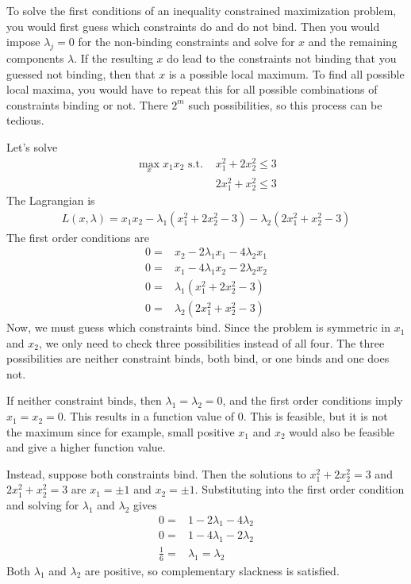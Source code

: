 To solve the first conditions of an inequality constrained
maximization problem, you would first guess which constraints do and
do not bind. Then you would impose $\lambda_j = 0$ for the non-binding
constraints and solve for $x$ and the remaining components
$\lambda$. If the resulting $x$ do lead to the constraints not binding
that you guessed not binding, then that $x$ is a possible local
maximum. To find all possible local maxima, you would have to repeat
this for all possible combinations of constraints binding or
not. There $2^m$ such possibilities, so this process can be
tedious. 
\begin{example}
  Let's solve
  \begin{align*}
    \max_x x_1 x_2 \text{ s.t. } & x_1^2 + 2x_2^2 \leq 3 \\
    & 2 x_1^2 + x_2^2 \leq  3
  \end{align*}
  The Lagrangian is
  \begin{align*}
    L(x,\lambda) = x_1x_2 - \lambda_1(x_1^2 + 2x_2^2 - 3) -
    \lambda_2(2 x_1^2 + x_2^2 - 3) 
  \end{align*}
  The first order conditions are
  \begin{align*}
    0 = & x_2 - 2\lambda_1 x_1 - 4\lambda_2 x_1 \\
    0 = & x_1 - 4\lambda_1 x_2 - 2\lambda_2 x_2  \\
    0 = & \lambda_1(x_1^2 + 2x_2^2 - 3) \\
    0 = & \lambda_2(2 x_1^2 + x_2^2 - 3) 
  \end{align*}
  Now, we must guess which constraints bind. Since the problem is
  symmetric in $x_1$ and $x_2$, we only need to check three
  possibilities instead of all four. The three possibilities are
  neither constraint binds, both bind, or one binds and one does not. 

  If neither constraint binds, then $\lambda_1 = \lambda_2 = 0$, and
  the first order conditions imply $x_1 = x_2 = 0$. This results in a
  function value of $0$. This is feasible, but it is not the maximum
  since for example, small positive $x_1$ and $x_2$ would also be
  feasible and give a higher function value.

  Instead, suppose both constraints bind. Then the solutions to 
  $x_1^2 + 2x_2^2 = 3$ and $2 x_1^2 + x_2^2 = 3$ are $x_1 = \pm 1$ and
  $x_2 = \pm 1$. Substituting into the first order condition and
  solving for $\lambda_1$ and $\lambda_2$ gives
  \begin{align*} 
    0 = & 1 - 2 \lambda_1 - 4\lambda_2 \\
    0 = & 1 - 4 \lambda_1 - 2\lambda_2 \\
    \frac{1}{6} = & \lambda_1 = \lambda_2
  \end{align*}
  Both $\lambda_1$ and $\lambda_2$ are positive, so complementary
  slackness is satisfied.


\end{example}
